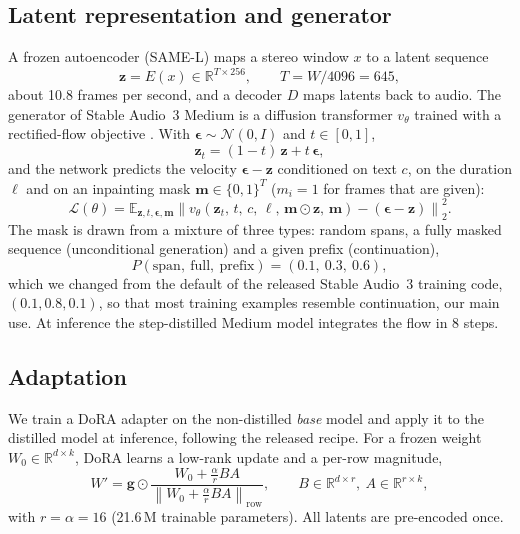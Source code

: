 \subsection{Latent representation and generator}
A frozen autoencoder (SAME-L) maps a stereo window $x$ to a latent sequence
\begin{equation}
  \mathbf{z} = E(x) \in \mathbb{R}^{T \times 256}, \qquad T = W / 4096 = 645,
\end{equation}
about 10.8 frames per second, and a decoder $D$ maps latents back to audio. The generator of Stable Audio~3
Medium \citep{evans2026stableaudio3} is a diffusion transformer \citep{peebles2022dit} $v_\theta$ trained with a
rectified-flow objective \citep{liu2022rectified}. With $\boldsymbol{\epsilon}\sim\mathcal{N}(0,I)$ and
$t\in[0,1]$,
\begin{equation}
  \mathbf{z}_t = (1-t)\,\mathbf{z} + t\,\boldsymbol{\epsilon},
\end{equation}
and the network predicts the velocity $\boldsymbol{\epsilon}-\mathbf{z}$ conditioned on text $c$, on the duration
$\ell$ and on an inpainting mask $\mathbf{m}\in\{0,1\}^{T}$ ($m_i=1$ for frames that are given):
\begin{equation}
  \mathcal{L}(\theta) = \mathbb{E}_{\mathbf{z},t,\boldsymbol{\epsilon},\mathbf{m}}
  \left\| v_\theta\!\left(\mathbf{z}_t,\, t,\, c,\, \ell,\, \mathbf{m}\odot\mathbf{z},\, \mathbf{m}\right)
  - (\boldsymbol{\epsilon}-\mathbf{z}) \right\|_2^2 .
  \label{eq:loss}
\end{equation}
The mask is drawn from a mixture of three types: random spans, a fully masked sequence (unconditional generation)
and a given prefix (continuation),
\begin{equation}
  P(\text{span},\ \text{full},\ \text{prefix}) = (0.1,\ 0.3,\ 0.6),
\end{equation}
which we changed from the default of the released Stable Audio~3 training code, $(0.1, 0.8, 0.1)$, so that most training examples resemble continuation, our main
use. At inference the step-distilled Medium model integrates the flow in 8 steps.

\subsection{Adaptation}
We train a DoRA adapter \citep{liu2024dora} on the non-distilled \emph{base} model and apply it to the distilled
model at inference, following the released recipe. For a frozen weight $W_0\in\mathbb{R}^{d\times k}$, DoRA learns
a low-rank update and a per-row magnitude,
\begin{equation}
  W' = \mathbf{g} \odot \frac{W_0 + \tfrac{\alpha}{r} BA}{\left\| W_0 + \tfrac{\alpha}{r} BA \right\|_{\mathrm{row}}},
  \qquad B\in\mathbb{R}^{d\times r},\ A\in\mathbb{R}^{r\times k},
\end{equation}
with $r=\alpha=16$ (21.6\,M trainable parameters). All latents are pre-encoded once.

